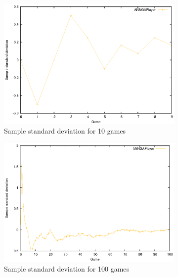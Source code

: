 		\begin{figure}[!ht]
			\centering
			\begin{subfigure}{.33\textwidth}
			  \centering
			  \includegraphics[width=\textwidth]{figures/luck_evolution_10}
			  \caption{Sample standard deviation for 10 games}
			  \label{fig:luck_evolition_10}
			\end{subfigure}%
			\begin{subfigure}{.33\textwidth}
			  \centering
			  \includegraphics[width=\textwidth]{figures/luck_evolution_100}
			  \caption{Sample standard deviation for 100 games}
			  \label{fig:luck_evolition_100}
			\end{subfigure}%
			\begin{subfigure}{.33\textwidth}
			  \centering

\end{subfigure}
\end{figure}

